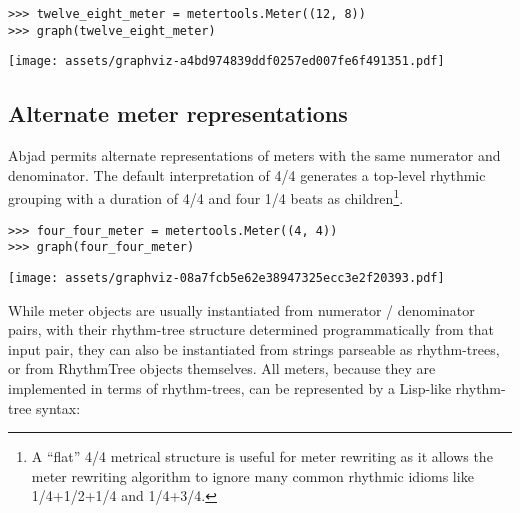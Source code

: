 \begin{singlespacing}
\vspace{-0.5\baselineskip}
\begin{lstlisting}
>>> twelve_eight_meter = metertools.Meter((12, 8))
>>> graph(twelve_eight_meter)
\end{lstlisting}
\texttt{[image: assets/graphviz-a4bd974839ddf0257ed007fe6f491351.pdf]}
\end{singlespacing}

\subsection{Alternate meter representations} %

Abjad permits alternate representations of meters with the same numerator and
denominator. The default interpretation of 4/4 generates a top-level rhythmic
grouping with a duration of 4/4 and four 1/4 beats as children\footnote{A
\enquote{flat} 4/4 metrical structure is useful for meter rewriting as it
allows the meter rewriting algorithm to ignore many common rhythmic idioms like
1/4+1/2+1/4 and 1/4+3/4.}.

\begin{comment}
<abjad>
four_four_meter = metertools.Meter((4, 4))
graph(four_four_meter)
</abjad>
\end{comment}

\begin{singlespacing}
\vspace{-0.5\baselineskip}
\begin{lstlisting}
>>> four_four_meter = metertools.Meter((4, 4))
>>> graph(four_four_meter)
\end{lstlisting}
\texttt{[image: assets/graphviz-08a7fcb5e62e38947325ecc3e2f20393.pdf]}
\end{singlespacing}

\noindent While meter objects are usually instantiated from numerator /
denominator pairs, with their rhythm-tree structure determined programmatically
from that input pair, they can also be instantiated from strings parseable as
rhythm-trees, or from RhythmTree objects themselves. All meters, because they
are implemented in terms of rhythm-trees, can be represented by a Lisp-like
rhythm-tree syntax:

\begin{comment}
<abjad>
print(four_four_meter.pretty_rtm_format)
</abjad>
\end{comment}

